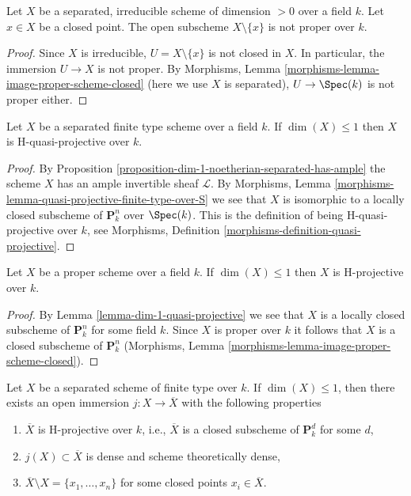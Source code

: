 \begin{lemma}
\label{lemma-proper-minus-point}
Let $X$ be a separated, irreducible scheme of dimension $> 0$ over a field $k$.
Let $x \in X$ be a closed point. The open subscheme $X \setminus \{x\}$
is not proper over $k$.
\end{lemma}

\begin{proof}
Since $X$ is irreducible, $U = X \setminus \{x\}$ is not closed in $X$.
In particular, the immersion $U \to X$ is not proper.
By Morphisms, Lemma \ref{morphisms-lemma-image-proper-scheme-closed}
(here we use $X$ is separated), $U \to \Spec(k)$ is not proper either.
\end{proof}

\begin{lemma}
\label{lemma-dim-1-quasi-projective}
Let $X$ be a separated finite type scheme over a field $k$.
If $\dim(X) \leq 1$ then $X$ is H-quasi-projective over $k$.
\end{lemma}

\begin{proof}
By Proposition \ref{proposition-dim-1-noetherian-separated-has-ample}
the scheme $X$ has an ample invertible sheaf $\mathcal{L}$.
By Morphisms, Lemma \ref{morphisms-lemma-quasi-projective-finite-type-over-S}
we see that $X$ is isomorphic to a locally
closed subscheme of $\mathbf{P}^n_k$ over $\Spec(k)$. This is
the definition of being H-quasi-projective over $k$, see
Morphisms, Definition \ref{morphisms-definition-quasi-projective}.
\end{proof}

\begin{lemma}
\label{lemma-dim-1-proper-projective}
Let $X$ be a proper scheme over a field $k$.
If $\dim(X) \leq 1$ then $X$ is H-projective over $k$.
\end{lemma}

\begin{proof}
By Lemma \ref{lemma-dim-1-quasi-projective} we see that $X$ is a
locally closed subscheme of $\mathbf{P}^n_k$ for some field $k$.
Since $X$ is proper over $k$ it follows that $X$ is a closed subscheme
of $\mathbf{P}^n_k$
(Morphisms, Lemma \ref{morphisms-lemma-image-proper-scheme-closed}).
\end{proof}

\begin{lemma}
\label{lemma-dim-1-projective-completion}
Let $X$ be a separated scheme of finite type over $k$.
If $\dim(X) \leq 1$, then there exists an open immersion
$j : X \to \overline{X}$ with the following properties
\begin{enumerate}
\item $\overline{X}$ is H-projective over $k$, i.e., $\overline{X}$
is a closed subscheme of $\mathbf{P}^d_k$ for some $d$,
\item $j(X) \subset \overline{X}$ is dense and scheme
theoretically dense,
\item $\overline{X} \setminus X = \{x_1, \ldots, x_n\}$
for some closed points $x_i \in \overline{X}$.
\end{enumerate}
\end{lemma}

